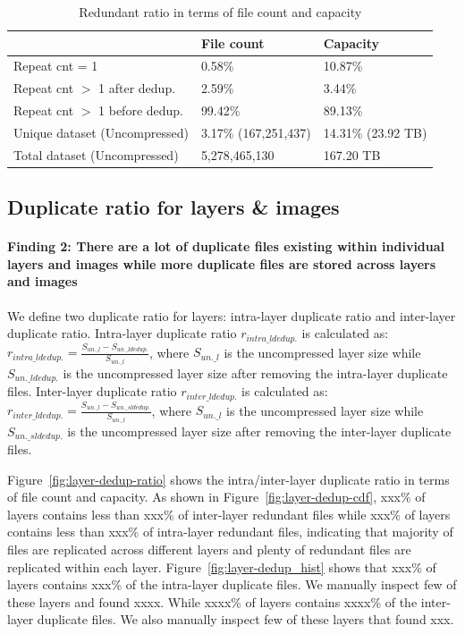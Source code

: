 \begin{table} 
	\centering 
	\scriptsize  
	\caption{Redundant ratio in terms of file count and capacity} \label{tbl:overall-redundant_ratio} 
	\begin{tabular}{|l|l|l|}%
		\hline  
		       & File count & Capacity \\
		\hline
		Repeat cnt = 1 & 0.58\% & 10.87\%\\
		\hline
		Repeat cnt $>$ 1 after dedup. & 2.59\% & 3.44\%\\
		\hline
		Repeat cnt $>$ 1 before dedup.  & 99.42\%  & 89.13\%\\
		\hline
		Unique dataset (Uncompressed) & 3.17\% (167,251,437)  &  14.31\% (23.92 TB) \\
		\hline 
		Total dataset (Uncompressed) & 5,278,465,130 & 167.20 TB \\
		\hline 	
	\end{tabular} 
\end{table} 

\subsection{Duplicate ratio for layers \& images}
\paragraph{Finding 2: There are a lot of duplicate files existing within individual layers and images while more duplicate files are stored across layers and images}

We define two duplicate ratio for layers: intra-layer duplicate ratio and inter-layer duplicate ratio. Intra-layer duplicate ratio $r_{intra\_ldedup.}$ is calculated as:
$r_{intra\_ldedup.} = \frac{S_{un.\_l} - S_{un.\_ldedup.}}{S_{un.\_l}}$, where $S_{un.\_l}$ is the uncompressed layer size while $S_{un.\_ldedup.}$ is the uncompressed layer size after removing the intra-layer duplicate files. Inter-layer duplicate ratio $r_{inter\_ldedup.}$ is calculated as:
$r_{inter\_ldedup.} = \frac{S_{un.\_l} - S_{un.\_sldedup.}}{S_{un.\_l}}$, where $S_{un.\_l}$ is the uncompressed layer size while $S_{un.\_sldedup.}$ is the uncompressed layer size after removing the inter-layer duplicate files.

Figure~\ref{fig:layer-dedup-ratio} shows the intra/inter-layer duplicate ratio in terms of file count and capacity. As shown in Figure~\ref{fig:layer-dedup-cdf},
xxx\% of layers contains less than xxx\% of inter-layer redundant files while xxx\% of layers contains less than xxx\% of intra-layer redundant files, indicating that majority of files are replicated across different layers and plenty of redundant files are replicated within each layer.
Figure~\ref{fig:layer-dedup_hist} shows that xxx\% of layers contains xxx\% of the intra-layer duplicate files. We manually inspect few of these layers and found xxxx.
While xxxx\% of layers contains xxxx\% of the inter-layer duplicate files. We also manually inspect few of these layers that found xxx.

